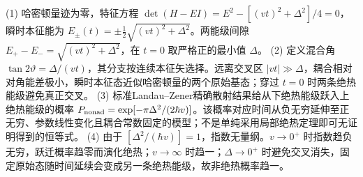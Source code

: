 (1) 哈密顿量迹为零，特征方程 \(\det(H-EI)=E^2-[(vt)^2+\Delta^2]/4=0\)，瞬时本征能为 \(E_\pm(t)=\pm\frac12\sqrt{(vt)^2+\Delta^2}\)。两能级间隙 \(E_+-E_-=\sqrt{(vt)^2+\Delta^2}\)，在 \(t=0\) 取严格正的最小值 \(\Delta\)。
(2) 定义混合角 \(\tan2\vartheta=\Delta/(vt)\)，其分支按连续本征矢选择。远离交叉区 \(|vt|\gg\Delta\)，耦合相对对角能差极小，瞬时本征态近似哈密顿量的两个原始基态；穿过 \(t=0\) 时两条绝热能级避免真正交叉。
(3) 标准Landau–Zener精确散射结果给从下绝热能级跃入上绝热能级的概率 \(P_{\rm nonad}=\exp[-\pi\Delta^2/(2\hbar v)]\)。该概率对应时间从负无穷延伸至正无穷、参数线性变化且耦合常数固定的模型；不是单纯采用局部绝热定理即可无证明得到的恒等式。
(4) 由于 \([\Delta^2/(\hbar v)]=1\)，指数无量纲。\(v\to0^+\) 时指数趋负无穷，跃迁概率趋零而演化绝热；\(v\to\infty\) 时趋一；\(\Delta\to0^+\) 时避免交叉消失，固定原始态随时间延续会变成另一条绝热能级，故非绝热概率趋一。

